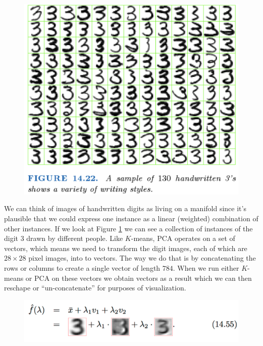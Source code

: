 \documentclass[a4paper]{article}
\begin{document}
\begin{figure}
\centering
\includegraphics[width=1.0\textwidth]{Figure1422.png}
\caption{\label{fig:1422}}
\end{figure}

We can think of images of handwritten digits as living on a manifold since it's plausible that we could express one instance as a linear (weighted) combination of other instances. If we look at Figure \ref{fig:1422} we can see a collection of instances of the digit 3 drawn by different people. Like $K$-means, PCA operates on a set of vectors, which means we need to transform the digit images, each of which are $28\times 28$ pixel images, into to vectors. The way we do that is by concatenating the rows or columns to create a single vector of length $784$.  When we run either $K$-means or PCA on these vectors we obtain vectors as a result which we can then reschape or ``un-concatenate'' for purposes of visualization.

\begin{figure}
\centering
\includegraphics[width=1.0\textwidth]{Figure1455.png}
\caption{\label{fig:1455}}
\end{figure}
\end{document}
